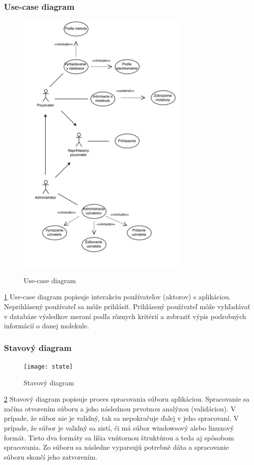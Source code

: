 \documentclass[12pt,a4paper]{article}
\begin{document}
\subsubsection{Use-case diagram}
\begin{figure}[H]
	\centering
	\caption{Use-case diagram}
	\includegraphics[width=0.75\textwidth]{use-case}
	\label{fig:use_case}
\end{figure}
\ref{fig:use_case}
Use-case diagram popisuje interakciu používateľov (aktorov) s aplikáciou. Neprihlásený používateľ sa môže prihlásiť. Prihlásený používateľ môže vyhľadávať v databáze výsledkov meraní podľa rôznych kritérií a zobraziť výpis podrobných informácií o danej molekule.

\subsubsection{Stavový diagram}
\begin{figure}[H]
	\centering
	\caption{Stavový diagram}
	\texttt{[image: state]}
	\label{fig:state}
\end{figure}
\ref{fig:state}
Stavový diagram popisuje proces spracovania súboru aplikáciou. Spracovanie sa začína otvorením súboru a jeho následnou prvotnou analýzou (validáciou). V prípade, že súbor nie je validný, tak sa nepokračuje ďalej v jeho spracovaní. V prípade, že súbor je validný sa zistí, či má súbor windowsový alebo linuxový formát. Tieto dva formáty sa líšia vnútornou štruktúrou a teda aj spôsobom spracovania. Zo súboru sa následne vyparsujú potrebné dáta a spracovanie súboru skončí jeho zatvorením. 
\end{document}
